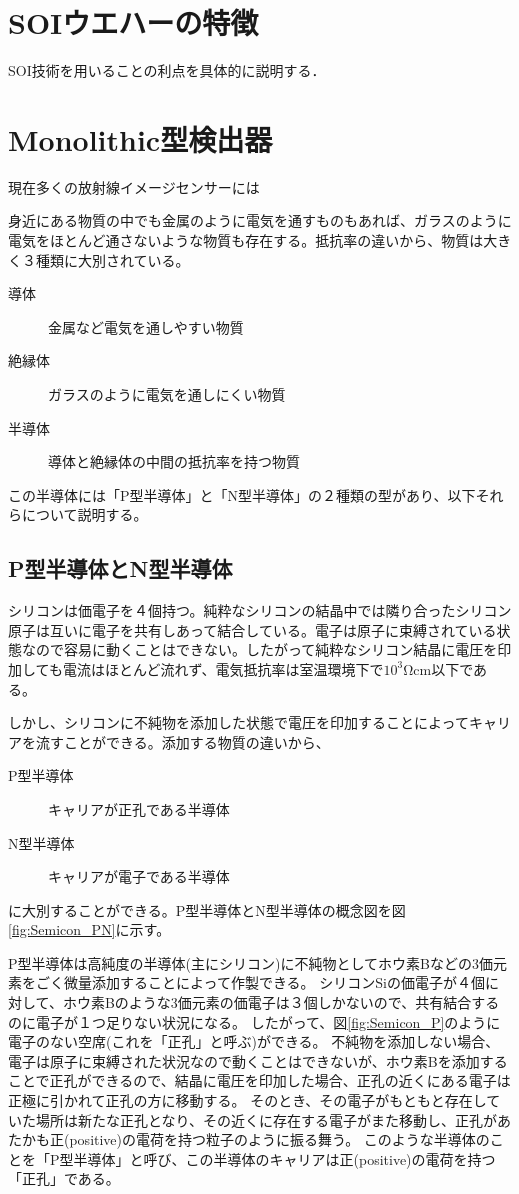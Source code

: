 \section{SOIウエハーの特徴}
SOI技術を用いることの利点を具体的に説明する．

\section{Monolithic型検出器}
現在多くの放射線イメージセンサーには



身近にある物質の中でも金属のように電気を通すものもあれば、ガラスのように電気をほとんど通さないような物質も存在する。抵抗率の違いから、物質は大きく３種類に大別されている。
	\begin{description}
		\item[導体] 金属など電気を通しやすい物質
		\item[絶縁体] ガラスのように電気を通しにくい物質
		\item[半導体] 導体と絶縁体の中間の抵抗率を持つ物質
	\end{description}
	
	この半導体には「P型半導体」と「N型半導体」の２種類の型があり、以下それらについて説明する。
	\subsection{P型半導体とN型半導体}
		シリコンは価電子を４個持つ。純粋なシリコンの結晶中では隣り合ったシリコン原子は互いに電子を共有しあって結合している。電子は原子に束縛されている状態なので容易に動くことはできない。したがって純粋なシリコン結晶に電圧を印加しても電流はほとんど流れず、電気抵抗率は室温環境下で$10^3 \mathrm{\Omega cm}$以下である。
		
		しかし、シリコンに不純物を添加した状態で電圧を印加することによってキャリアを流すことができる。添加する物質の違いから、
		\begin{description}
			\item[P型半導体] キャリアが正孔である半導体
			\item[N型半導体] キャリアが電子である半導体
		\end{description}
		に大別することができる。P型半導体とN型半導体の概念図を図\ref{fig:Semicon_PN}に示す。
		
		P型半導体は高純度の半導体(主にシリコン)に不純物としてホウ素Bなどの3価元素をごく微量添加することによって作製できる。
		シリコンSiの価電子が４個に対して、ホウ素Bのような3価元素の価電子は３個しかないので、共有結合するのに電子が１つ足りない状況になる。
		したがって、図\ref{fig:Semicon_P}のように電子のない空席(これを「正孔」と呼ぶ)ができる。
		不純物を添加しない場合、電子は原子に束縛された状況なので動くことはできないが、ホウ素Bを添加することで正孔ができるので、結晶に電圧を印加した場合、正孔の近くにある電子は正極に引かれて正孔の方に移動する。
		そのとき、その電子がもともと存在していた場所は新たな正孔となり、その近くに存在する電子がまた移動し、正孔があたかも正(positive)の電荷を持つ粒子のように振る舞う。
		このような半導体のことを「P型半導体」と呼び、この半導体のキャリアは正(positive)の電荷を持つ「正孔」である。
		
